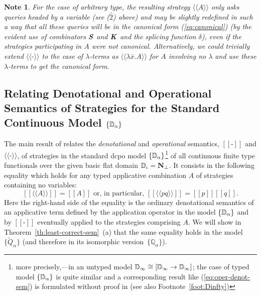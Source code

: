 \documentclass[fleqn]{LMCS}
\theoremstyle{plain}\newtheorem{satz}[thm]{Satz}
\theoremstyle{plain}\newtheorem{hyp}[thm]{Hypothesis}
\theoremstyle{plain}\newtheorem{hyps}[thm]{Hypotheses}
\theoremstyle{definition}\newtheorem{note}[thm]{Note}
\newcommand{\defis}{\mbox{-}}
\newcommand{\setof}[1]{\{#1\}}
\newcommand{\arr}{\rightarrow}
\newcommand{\lla}{\langle\!\langle}
\newcommand{\rra}{\rangle\!\rangle}
\newcommand{\Osem}[1]{\lla #1 \rra}
\newcommand{\Dsem}[1]{[\![ #1 ]\!]}
\newcommand{\NN}{\mathbf{N}}
\newcommand{\bbQ}{\mathbb{Q}}
\newcommand{\K}{\mbox{\bf K}}
\newcommand{\Ss}{\mbox{\bf S}}
\newcommand{\Undef}{{\perp}}
\newcommand{\bx}{\bar{x}}
\newcommand{\tQ}{\tilde{Q}}
\newcommand{\?}{\mbox{?}}
\begin{document}
\begin{note}\label{note:canonical}\em
For the case of arbitrary type, 
the resulting strategy $\Osem{A}$ only asks queries headed by a variable 
(see ($\hat{2}$) above) and 
may be slightly redefined in such a way that 
all these queries will be in the \emph{canonical}
form (\ref{eq:canonical}) 
(by the evident use of combinators \Ss\ and \K\ and the splicing function 
$\delta$), 
even if the strategies participating in $A$ were not canonical. 
Alternatively, we could trivially extend $\Osem{\defis}$ to the case of 
$\lambda$-terms as $\Osem{\lambda\bx.A}$ for $A$ involving no $\lambda$ 
and use these $\lambda$-terms to get the canonical form. 
\end{note}


\subsection{Relating Denotational and Operational Semantics 
of Strategies for the Standard Continuous Model 
\texorpdfstring{$\{\mathbb{D}_\alpha\}$}{D}}
\label{sec:denot-oper}

\noindent
The main result of \cite{Saz76SMZH} relates
the {\em denotational\/} and {\em operational\/} 
semantics, $\Dsem{\mbox{-}}$
and $\Osem{\mbox{-}}$, of strategies in the
standard dcpo model $\{\mathbb{D}_\alpha\}$\footnote{more precisely,---in an untyped model
	$\bbD_{\infty} \cong [\bbD_{\infty}\arr \bbD_{\infty}]$;
	the case of typed model $\{\mathbb{D}_\alpha\}$ is quite similar
	and a corresponding result like (\ref{eq:oper-denot-sem}) 
	is formulated without proof in 
        \cite{Saz76AL} (see also Footnote~\ref{foot:Dinfty})
	 }
of all continuous finite type functionals over the given basic flat domain
$\bbD_{\iota}=\NN_{\Undef}$. 
It consists in the
following equality which holds for any 
typed applicative combination $A$ of
strategies containing no variables:
\begin{equation}\label{eq:oper-denot-sem}
\Dsem{\Osem{A}} = \Dsem{A}\mbox{  or, in particular, }
\Dsem{\Osem{pq}} = \Dsem{p}\Dsem{q}. 
\end{equation}
Here the right-hand side of the equality 
is the ordinary denotational semantics of an
applicative term defined by the application operator 
in the model $\{\mathbb{D}_\alpha\}$
and by $\Dsem{\mbox{-}}$ eventually applied to the strategies comprising $A$.
We will show in Theorem~\ref{th:least-correct-sem}~(a) 
that the same equality holds in the model $\setof{\tQ_\alpha}$ 
(and therefore in its isomorphic version~$\setof{\bbQ_\alpha}$). 
\end{document}
